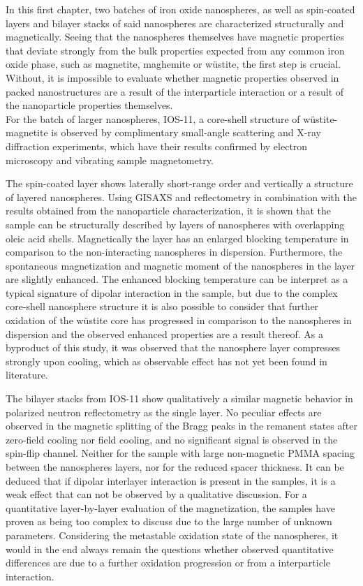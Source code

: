 \documentclass[\main/dresen_thesis.tex]{subfiles}
\begin{document}
  In this first chapter, two batches of iron oxide nanospheres, as well as spin-coated layers and bilayer stacks of said nanospheres are characterized structurally and magnetically.
  Seeing that the nanospheres themselves have magnetic properties that deviate strongly from the bulk properties expected from any common iron oxide phase, such as magnetite, maghemite or w\"ustite, the first step is crucial.
  Without, it is impossible to evaluate whether magnetic properties observed in packed nanostructures are a result of the interparticle interaction or a result of the nanoparticle properties themselves.
  \\

  For the batch of larger nanospheres, IOS-11, a core-shell structure of w\"ustite-magnetite is observed by complimentary small-angle scattering and X-ray diffraction experiments, which have their results confirmed by electron microscopy and vibrating sample magnetometry.

  The spin-coated layer shows laterally short-range order and vertically a structure of layered nanospheres.
  Using GISAXS and reflectometry in combination with the results obtained from the nanoparticle characterization, it is shown that the sample can be structurally described by layers of nanospheres with overlapping oleic acid shells.
  Magnetically the layer has an enlarged blocking temperature in comparison to the non-interacting nanospheres in dispersion.
  Furthermore, the spontaneous magnetization and magnetic moment of the nanospheres in the layer are slightly enhanced.
  The enhanced blocking temperature can be interpret as a typical signature of dipolar interaction in the sample, but due to the complex core-shell nanosphere structure it is also possible to consider that further oxidation of the w\"ustite core has progressed in comparison to the nanospheres in dispersion and the observed enhanced properties are a result thereof.
  As a byproduct of this study, it was observed that the nanosphere layer compresses strongly upon cooling, which as observable effect has not yet been found in literature.

  The bilayer stacks from IOS-11 show qualitatively a similar magnetic behavior in polarized neutron reflectometry as the single layer.
  No peculiar effects are observed in the magnetic splitting of the Bragg peaks in the remanent states after zero-field cooling nor field cooling, and no significant signal is observed in the spin-flip channel.
  Neither for the sample with large non-magnetic PMMA spacing between the nanospheres layers, nor for the reduced spacer thickness.
  It can be deduced that if dipolar interlayer interaction is present in the samples, it is a weak effect that can not be observed by a qualitative discussion.
  For a quantitative layer-by-layer evaluation of the magnetization, the samples have proven as being too complex to discuss due to the large number of unknown parameters.
  Considering the metastable oxidation state of the nanospheres, it would in the end always remain the questions whether observed quantitative differences are due to a further oxidation progression or from a interparticle interaction.
  \\
\end{document}
